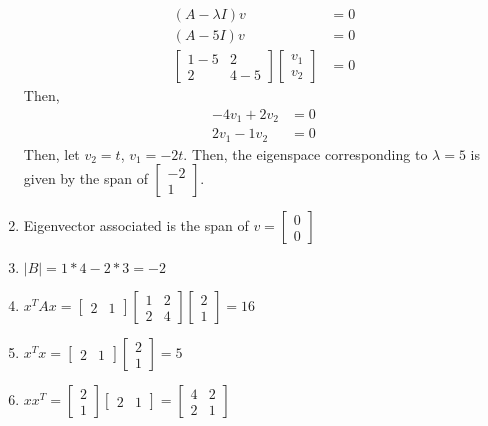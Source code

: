 \documentclass[11pt]{scrartcl}
\begin{document}
\begin{enumerate}
\begin{align*}
(A - \lambda I) v &= 0 \\
(A - 5I) v &= 0 \\
\begin{bmatrix} 1 - 5 & 2 \\ 2 & 4 - 5 \end{bmatrix} \begin{bmatrix} v_1 \\ v_2 \end{bmatrix} &= 0
\end{align*}
Then,
\begin{align*}
-4v_1 + 2v_2 &= 0 \\
2v_1 -1v_2 &= 0
\end{align*}
Then, let $v_2 = t$, $v_1 = -2t$. Then, the eigenspace corresponding to $\lambda = 5$ is given by the span of $\begin{bmatrix} -2 \\ 1 \end{bmatrix}$.
\item Eigenvector associated is the span of $v = \begin{bmatrix} 0 \\ 0 \end{bmatrix}$

\item $|B| = 1*4 - 2*3 = -2$

\item $x^T Ax = \begin{bmatrix} 2 & 1 \end{bmatrix} \begin{bmatrix} 1 & 2 \\ 2 & 4 \end{bmatrix} \begin{bmatrix} 2 \\ 1 \end{bmatrix} = 16$

\item $x^T x = \begin{bmatrix} 2 & 1 \end{bmatrix} \begin{bmatrix} 2 \\ 1 \end{bmatrix} = 5$

\item $x x^T = \begin{bmatrix} 2 \\ 1 \end{bmatrix} \begin{bmatrix} 2 & 1 \end{bmatrix} = \begin{bmatrix} 4 & 2 \\ 2 & 1 \end{bmatrix}$


\end{enumerate}
\end{document}
